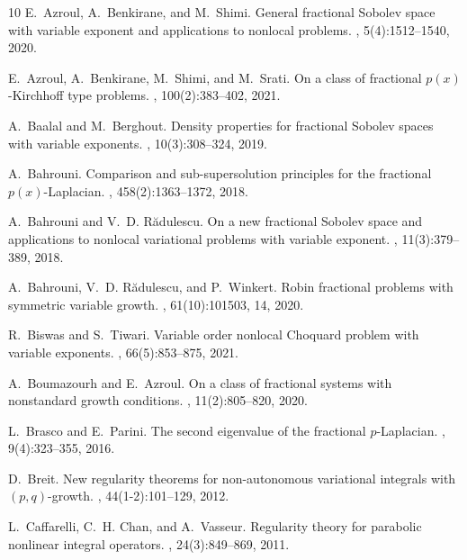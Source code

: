 \documentclass[11pt]{amsart}
\theoremstyle{plain}
\theoremstyle{definition}
\numberwithin{equation}{section}
\begin{document}
\begin{thebibliography}{10}
E.~Azroul, A.~Benkirane, and M.~Shimi.
\newblock General fractional {S}obolev space with variable exponent and
  applications to nonlocal problems.
, 5(4):1512--1540, 2020.

E.~Azroul, A.~Benkirane, M.~Shimi, and M.~Srati.
\newblock On a class of fractional {$p(x)$}-{K}irchhoff type problems.
, 100(2):383--402, 2021.

A.~Baalal and M.~Berghout.
\newblock Density properties for fractional {S}obolev spaces with variable
  exponents.
, 10(3):308--324, 2019.

A.~Bahrouni.
\newblock Comparison and sub-supersolution principles for the fractional
  {$p(x)$}-{L}aplacian.
, 458(2):1363--1372, 2018.

A.~Bahrouni and V.~D. R\u{a}dulescu.
\newblock On a new fractional {S}obolev space and applications to nonlocal
  variational problems with variable exponent.
, 11(3):379--389, 2018.

A.~Bahrouni, V.~D. R\u{a}dulescu, and P.~Winkert.
\newblock Robin fractional problems with symmetric variable growth.
, 61(10):101503, 14, 2020.

R.~Biswas and S.~Tiwari.
\newblock Variable order nonlocal {C}hoquard problem with variable exponents.
, 66(5):853--875, 2021.

A.~Boumazourh and E.~Azroul.
\newblock On a class of fractional systems with nonstandard growth conditions.
, 11(2):805--820, 2020.

L.~Brasco and E.~Parini.
\newblock The second eigenvalue of the fractional {$p$}-{L}aplacian.
, 9(4):323--355, 2016.

D.~Breit.
\newblock New regularity theorems for non-autonomous variational integrals with
  {$(p,q)$}-growth.
, 44(1-2):101--129,
  2012.

L.~Caffarelli, C.~H. Chan, and A.~Vasseur.
\newblock Regularity theory for parabolic nonlinear integral operators.
, 24(3):849--869, 2011.


\end{thebibliography}
\end{document}
